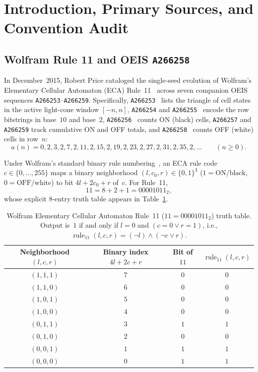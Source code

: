 \documentclass[11pt]{article}
\theoremstyle{definition}
\newcommand{\seq}[1]{\texttt{#1}}
\newcommand{\ruleTT}{\operatorname{rule}_{11}}
\begin{document}
\section{Introduction, Primary Sources, and Convention Audit}

\subsection{Wolfram Rule 11 and OEIS \texorpdfstring{\seq{A266258}}{A266258}}

In December~2015, Robert Price cataloged the single-seed evolution of Wolfram's Elementary Cellular Automaton (ECA) Rule~11~\cite{wolfram2002,mathworldECA} across seven companion OEIS sequences \seq{A266253}--\seq{A266259}. Specifically, \seq{A266253}~\cite{oeis266253} lists the triangle of cell states in the active light-cone window $[-n, n]$, \seq{A266254} and \seq{A266255}~\cite{oeis266254,oeis266255} encode the row bitstrings in base~$10$ and base~$2$, \seq{A266256}~\cite{oeis266256} counts ON (black) cells, \seq{A266257} and \seq{A266259} track cumulative ON and OFF totals, and \seq{A266258}~\cite{oeis266258} counts OFF (white) cells in row~$n$:
\[
a(n) = 0, 2, 3, 2, 7, 2, 11, 2, 15, 2, 19, 2, 23, 2, 27, 2, 31, 2, 35, 2, \dots \qquad (n \ge 0).
\]

Under Wolfram's standard binary rule numbering~\cite{wolfram2002}, an ECA rule code $c \in \{0, \dots, 255\}$ maps a binary neighborhood $(l, c_0, r) \in \{0, 1\}^3$ ($1 = \text{ON/black}$, $0 = \text{OFF/white}$) to bit $4l + 2c_0 + r$ of~$c$. For Rule~11,
\[
11 = 8 + 2 + 1 = 00001011_2,
\]
whose explicit $8$-entry truth table appears in Table~\ref{tab:rule11-tt}.

\begin{table}[ht]
\centering
\caption{Wolfram Elementary Cellular Automaton Rule~11 ($11 = 00001011_2$) truth table. Output is~$1$ if and only if $l = 0$ and $(c = 0 \lor r = 1)$, i.e., $\ruleTT(l, c, r) = (\neg l) \land (\neg c \lor r)$.}
\label{tab:rule11-tt}
\smallskip
{\small
\begin{tabular}{@{}c c c c@{}}
\toprule
Neighborhood $(l, c, r)$ & Binary index $4l + 2c + r$ & Bit of $11$ & $\ruleTT(l, c, r)$ \\
\midrule
$(1, 1, 1)$ & $7$ & $0$ & $0$ \\
$(1, 1, 0)$ & $6$ & $0$ & $0$ \\
$(1, 0, 1)$ & $5$ & $0$ & $0$ \\
$(1, 0, 0)$ & $4$ & $0$ & $0$ \\
$(0, 1, 1)$ & $3$ & $1$ & $1$ \\
$(0, 1, 0)$ & $2$ & $0$ & $0$ \\
$(0, 0, 1)$ & $1$ & $1$ & $1$ \\
$(0, 0, 0)$ & $0$ & $1$ & $1$ \\
\bottomrule
\end{tabular}
}
\end{table}
\end{document}
